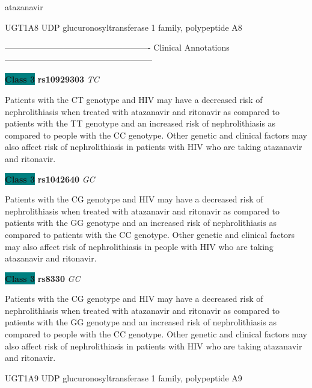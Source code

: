 \documentclass{resume} %
\begin{document}
\begin{rSection}{ atazanavir }
\begin{rSubsection}{ UGT1A8 }{ UDP glucuronosyltransferase 1 family, polypeptide A8 }{}{}
\item[] ---------------------------------------------------- Clinical Annotations -----------------------------------------------------\newline
\item \textbf{\colorbox{teal} {Class 3}} \textbf{ rs10929303 } \textit{ TC }
\item[] Patients with the CT genotype and HIV may have a decreased risk of nephrolithiasis when treated with atazanavir and ritonavir as compared to patients with the TT genotype and an increased risk of nephrolithiasis as compared to people with the CC genotype. Other genetic and clinical factors may also affect risk of nephrolithiasis in patients with HIV who are taking atazanavir and ritonavir. \item \textbf{\colorbox{teal} {Class 3}} \textbf{ rs1042640 } \textit{ GC }
\item[] Patients with the CG genotype and HIV may have a decreased risk of nephrolithiasis when treated with atazanavir and ritonavir as compared to patients with the GG genotype and an increased risk of nephrolithiasis as compared to patients with the CC genotype. Other genetic and clinical factors may also affect risk of nephrolithiasis in people with HIV who are taking atazanavir and ritonavir.\item \textbf{\colorbox{teal} {Class 3}} \textbf{ rs8330 } \textit{ GC }
\item[] Patients with the CG genotype and HIV may have a decreased risk of nephrolithiasis when treated with atazanavir and ritonavir as compared to patients with the GG genotype and an increased risk of nephrolithiasis as compared to people with the CC genotype. Other genetic and clinical factors may also affect risk of nephrolithiasis in patients with HIV who are taking atazanavir and ritonavir.
\end{rSubsection}\begin{rSubsection}{ UGT1A9 }{ UDP glucuronosyltransferase 1 family, polypeptide A9 }{}{}
\item[]


\end{rSubsection}
\end{rSection}
\end{document}
